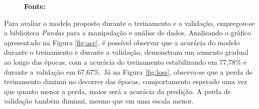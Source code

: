 \begin{figure}[ht]
\begin{minipage}[b]{0.45\textwidth}
        \label{fig:predicao_com}
        \textbf{\footnotesize Fonte: \href{https://www.kaggle.com/datasets/awsaf49/cbis-ddsm-breast-cancer-image-dataset}{\cite{newdatabase}}}
    \end{minipage}
\end{figure}



Para avaliar o modelo proposto durante o treinamento e a validação, empregou-se a biblioteca \textit{Pandas} para a manipulação e análise de dados. Analisando o gráfico apresentado na Figura \ref{fig:acc}, é possível observar que a acurácia do modelo durante o treinamento e durante a validação, demonstram um aumento gradual ao longo das épocas, com a acurácia do treinamento estabilizando em 77,78\% e durante a validação em 67,67\%. Já na Figura \ref{fig:loss}, observa-se que a perda de treinamento diminui no decorrer das épocas, comportamento esperado uma vez que quanto menor a perda, maior será a acurácia da predição. A perda de validação também diminui, mesmo que em uma escala menor.

